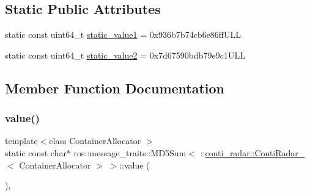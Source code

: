 \subsection*{Static Public Attributes}
\begin{DoxyCompactItemize}
\item 
static const uint64\+\_\+t \hyperlink{structros_1_1message__traits_1_1MD5Sum_3_01_1_1conti__radar_1_1ContiRadar___3_01ContainerAllocator_01_4_01_4_a66b4af3f606f9430c21d0590be850e12}{static\+\_\+value1} = 0x936b7b74cb6e86ff\+U\+LL
\item 
static const uint64\+\_\+t \hyperlink{structros_1_1message__traits_1_1MD5Sum_3_01_1_1conti__radar_1_1ContiRadar___3_01ContainerAllocator_01_4_01_4_a8b73e8c00865826204d1530177125472}{static\+\_\+value2} = 0x7d67590bdb79e9c1\+U\+LL
\end{DoxyCompactItemize}


\subsection{Member Function Documentation}
\mbox{\label{structros_1_1message__traits_1_1MD5Sum_3_01_1_1conti__radar_1_1ContiRadar___3_01ContainerAllocator_01_4_01_4_a77147d9f7af8df77e4fd0ca2f38fddf6}} 
\subsubsection{\texorpdfstring{value()}{value()}\hspace{0.1cm}{\footnotesize\ttfamily [1/2]}}
{\footnotesize\ttfamily template$<$class Container\+Allocator $>$ \\
static const char$\ast$ ros\+::message\+\_\+traits\+::\+M\+D5\+Sum$<$ \+::\hyperlink{structconti__radar_1_1ContiRadar__}{conti\+\_\+radar\+::\+Conti\+Radar\+\_\+}$<$ Container\+Allocator $>$ $>$\+::value (\begin{DoxyParamCaption}{ }\end{DoxyParamCaption})\hspace{0.3cm}{\ttfamily [inline]}, {\ttfamily [static]}}

